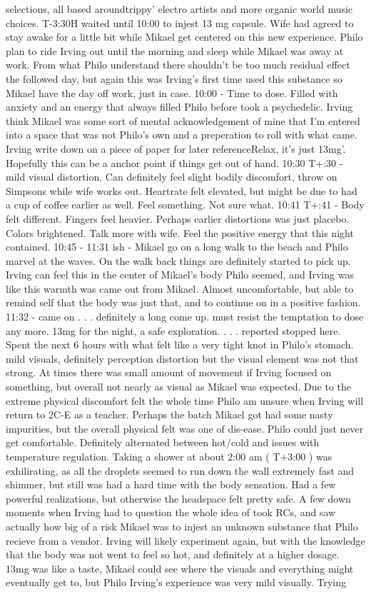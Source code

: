 \documentclass[12pt]{book}
\begin{document}
selections, all based aroundtrippy' electro artists and more organic world music choices. T-3:30H waited until 10:00 to injest 13 mg capsule. Wife had agreed to stay awake for a little bit while Mikael get centered on this new experience. Philo plan to ride Irving out until the morning and sleep while Mikael was away at work. From what Philo understand there shouldn't be too much residual effect the followed day, but again this was Irving's first time used this substance so Mikael have the day off work, just in case. 10:00 - Time to dose. Filled with anxiety and an energy that always filled Philo before took a psychedelic. Irving think Mikael was some sort of mental acknowledgement of mine that I'm entered into a space that was not Philo's own and a preperation to roll with what came. Irving write down on a piece of paper for later referenceRelax, it's just 13mg'. Hopefully this can be a anchor point if things get out of hand. 10:30 T+:30 - mild visual distortion. Can definitely feel slight bodily discomfort, throw on Simpsons while wife works out. Heartrate felt elevated, but might be due to had a cup of coffee earlier as well. Feel something. Not sure what. 10:41 T+:41 - Body felt different. Fingers feel heavier. Perhaps earlier distortions was just placebo. Colors brightened. Talk more with wife. Feel the positive energy that this night contained. 10:45 - 11:31 ish - Mikael go on a long walk to the beach and Philo marvel at the waves. On the walk back things are definitely started to pick up. Irving can feel this in the center of Mikael's body Philo seemed, and Irving was like this warmth was came out from Mikael. Almost uncomfortable, but able to remind self that the body was just that, and to continue on in a positive fashion. 11:32 - came on  . . .  definitely a long come up. must resist the temptation to dose any more. 13mg for the night, a safe exploration.  . . .  reported stopped here. Spent the next 6 hours with what felt like a very tight knot in Philo's stomach. mild visuals, definitely perception distortion but the visual element was not that strong. At times there was small amount of movement if Irving focused on something, but overall not nearly as visual as Mikael was expected. Due to the extreme physical discomfort felt the whole time Philo am unsure when Irving will return to 2C-E as a teacher. Perhaps the batch Mikael got had some nasty impurities, but the overall physical felt was one of dis-ease. Philo could just never get comfortable. Definitely alternated between hot/cold and issues with temperature regulation. Taking a shower at about 2:00 am ( T+3:00 ) was exhilirating, as all the droplets seemed to run down the wall extremely fast and shimmer, but still was had a hard time with the body sensation. Had a few powerful realizations, but otherwise the headspace felt pretty safe. A few down moments when Irving had to question the whole idea of took RCs, and saw actually how big of a risk Mikael was to injest an unknown substance that Philo recieve from a vendor. Irving will likely experiment again, but with the knowledge that the body was not went to feel so hot, and definitely at a higher dosage. 13mg was like a taste, Mikael could see where the visuals and everything might eventually get to, but Philo Irving's experience was very mild visually. Trying 
\end{document}
